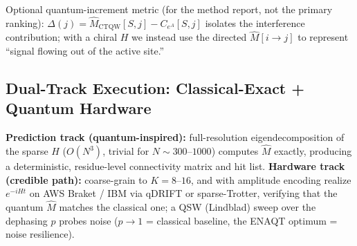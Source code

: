 \documentclass[11pt,a4paper]{article}
\newcommand{\mhat}{\hat{M}}
\newcommand{\lead}[1]{\textbf{#1}}
\newcommand{\note}[1]{{\color{grey}\small #1}}
\begin{document}
\note{Optional quantum-increment metric (for the method report, not the primary ranking): $\Delta(j)=\mhat_{\text{CTQW}}[S,j]-C_{e^{A}}[S,j]$ isolates the interference contribution; with a chiral $H$ we instead use the directed $\mhat[i\!\to\!j]$ to represent ``signal flowing out of the active site.''}

\subsection{Dual-Track Execution: Classical-Exact + Quantum Hardware}
\lead{Prediction track (quantum-inspired):} full-resolution eigendecomposition of the sparse $H$ ($O(N^3)$, trivial for $N\sim 300$--$1000$) computes $\mhat$ exactly, producing a deterministic, residue-level connectivity matrix and hit list. \lead{Hardware track (credible path):} coarse-grain to $K=8$--$16$, and with amplitude encoding realize $e^{-iHt}$ on AWS Braket / IBM via qDRIFT or sparse-Trotter, verifying that the quantum $\mhat$ matches the classical one; a QSW (Lindblad) sweep over the dephasing $p$ probes noise ($p\to 1$ = classical baseline, the ENAQT optimum = noise resilience).
\end{document}
